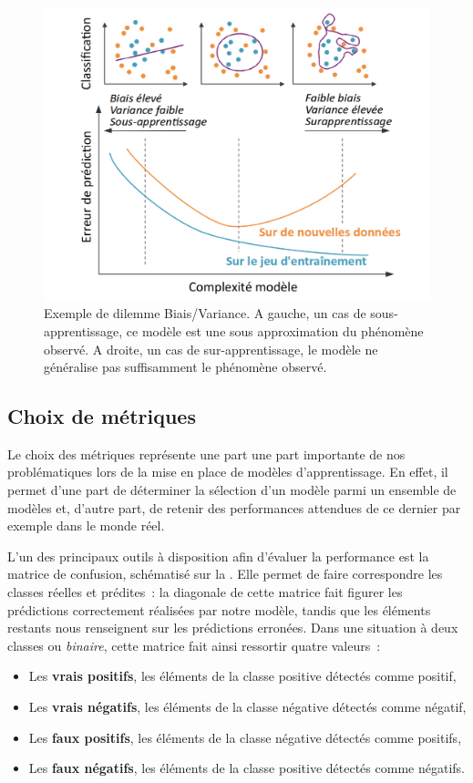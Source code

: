 \begin{figure}[H]
    \centering
    \includegraphics[width=0.8\linewidth]{contents/chapter_3/resources/example_underfit_overfit.pdf}
    \caption{Exemple de dilemme Biais/Variance. A gauche, un cas de sous-apprentissage, ce modèle est une sous approximation du phénomène observé. A droite, un cas de sur-apprentissage, le modèle ne généralise pas suffisamment le phénomène observé.}
    \label{fig:example_underfit_overfit}
\end{figure}

\subsection{Choix de métriques}
\label{subsec:metrics}
Le choix des métriques représente une part une part importante de nos problématiques lors de la mise en place de modèles d’apprentissage. En effet, il permet d'une part de déterminer la sélection d'un modèle parmi un ensemble de modèles et, d'autre part, de retenir des performances attendues de ce dernier par exemple dans le monde réel.\par

L’un des principaux outils à disposition afin d'évaluer la performance est la matrice de confusion, schématisé sur la . Elle permet de faire correspondre les classes réelles et prédites~: la diagonale de cette matrice fait figurer les prédictions correctement réalisées par notre modèle, tandis que les éléments restants nous renseignent sur les prédictions erronées. Dans une situation à deux classes ou \textit{binaire}, cette matrice fait ainsi ressortir quatre valeurs~:
\begin{itemize}
	\item Les \textbf{vrais positifs}, les éléments de la classe positive détectés comme positif,
	\item Les \textbf{vrais négatifs}, les éléments de la classe négative détectés comme négatif,
	\item Les \textbf{faux positifs}, les éléments de la classe négative détectés comme positifs,
	\item Les \textbf{faux négatifs}, les éléments de la classe positive détectés comme négatifs.
\end{itemize}\par

